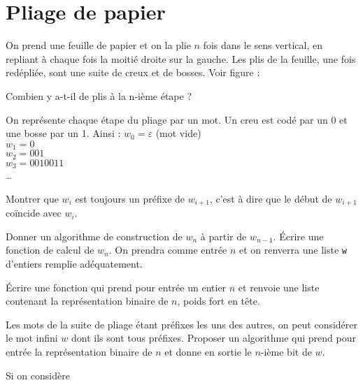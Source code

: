 \renewcommand{\SourceFile}{2-jouer-avec-les-mots/src/2-2.ml}

\section{Pliage de papier}

On prend une feuille de papier et on la plie $n$ fois dans le sens vertical, en repliant à chaque fois la moitié droite sur la gauche. Les plis de la feuille, une fois redépliée, sont une suite de creux et de bosses. Voir figure :


\Q
Combien y a-t-il de plis à la n-ième étape ?

\Q
On représente chaque étape du pliage par un mot. Un creu est codé par un 0 et une bosse par un 1. Ainsi : $w_0=\varepsilon$ (mot vide)\\
$w_1=0$\\
$w_2=001$\\
$w_3=0010011$\\
\dots
\medskip

Montrer que $w_i$ est toujours un préfixe de $w_{i+1}$, c'est à dire que le début de $w_{i+1}$ coïncide avec $w_i$.

\Q
Donner un algorithme de construction de $w_n$ à partir de $w_{n-1}$. Écrire une fonction de calcul de $w_n$. On prendra comme entrée $n$ et on renverra une liste \texttt{w} d'entiers remplie adéquatement.

\Q
Écrire une fonction qui prend pour entrée un entier $n$ et renvoie une liste contenant la représentation binaire de $n$, poids fort en tête.

\Q
Les mots de la suite de pliage étant préfixes les uns des autres, on peut considérer le mot infini $w$ dont ils sont tous préfixes. Proposer un algorithme qui prend pour entrée la représentation binaire de $n$ et donne en sortie le $n$-ième bit de $w$.

\Corrige

\Q
Si on considère